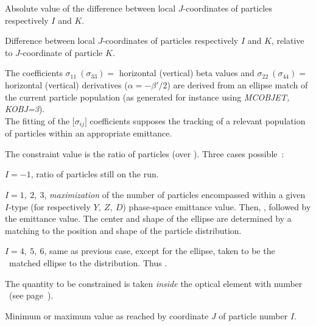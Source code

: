 
\smallskip

 Absolute value of the difference between local $J$-coordinates of particles respectively 
 $I$ and $K$.

\smallskip

 Difference between local $J$-coordinates of particles respectively 
 $I$ and $K$, relative to $J$-coordinate of particle $K$.

\smallskip

 The coefficients 
$ \sigma_{11}~(\sigma_{ 33}) = $ horizontal (vertical) beta values and 
$ \sigma_{ 22}~(\sigma_{ 44}) = $ horizontal (vertical) derivatives ($\alpha = -\beta'/2$) 
are derived from an ellipse match of the current particle population (as generated for instance using 
\textsl{MCOBJET, KOBJ=3}).\\
%
The fitting of the $ \lbrack \sigma_{ij}\rbrack $ 
coefficients supposes the tracking of a relevant population of particles within an 
appropriate emittance.  

\smallskip

 The constraint value  is the ratio of particles (over \IMAX). Three cases possible~: 

     $I=-1$,  ratio of particles still on the run. 

    $I =1, ~ 2, ~ 3$,   \textsl{maximization} of the number of particles 
 encompassed within a given $I$-type 
(for respectively $Y,~Z,~D$) phase-space emittance value. Then, , followed by the emittance value. 
The center and shape of the ellipse are  
 determined by a  matching to  the position and shape of the particle distribution. 

     $I =4, ~ 5, ~ 6$,  same as previous case, except for the ellipse, taken to be the \rms\ matched ellipse 
to the distribution. Thus .

\smallskip

 The quantity to be constrained is 
taken  \textsl{inside } the optical element with number \IR\ (see page~\pageref{RefIR}). 

\smallskip

 Minimum or maximum value as reached by coordinate $J$ of particle number $I$. 

\smallskip

